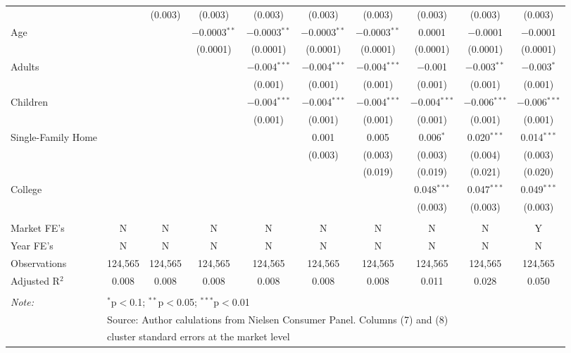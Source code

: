 \begin{table}[!htbp]
\begin{tabular}{@{\extracolsep{5pt}}lccccccccc}
  &  & (0.003) & (0.003) & (0.003) & (0.003) & (0.003) & (0.003) & (0.003) & (0.003) \\ 
  Age &  &  & $-$0.0003$^{**}$ & $-$0.0003$^{**}$ & $-$0.0003$^{**}$ & $-$0.0003$^{**}$ & 0.0001 & $-$0.0001 & $-$0.0001 \\ 
  &  &  & (0.0001) & (0.0001) & (0.0001) & (0.0001) & (0.0001) & (0.0001) & (0.0001) \\ 
  Adults &  &  &  & $-$0.004$^{***}$ & $-$0.004$^{***}$ & $-$0.004$^{***}$ & $-$0.001 & $-$0.003$^{**}$ & $-$0.003$^{*}$ \\ 
  &  &  &  & (0.001) & (0.001) & (0.001) & (0.001) & (0.001) & (0.001) \\ 
  Children &  &  &  & $-$0.004$^{***}$ & $-$0.004$^{***}$ & $-$0.004$^{***}$ & $-$0.004$^{***}$ & $-$0.006$^{***}$ & $-$0.006$^{***}$ \\ 
  &  &  &  & (0.001) & (0.001) & (0.001) & (0.001) & (0.001) & (0.001) \\ 
  Single-Family Home &  &  &  &  & 0.001 & 0.005 & 0.006$^{*}$ & 0.020$^{***}$ & 0.014$^{***}$ \\ 
  &  &  &  &  & (0.003) & (0.003) & (0.003) & (0.004) & (0.003) \\ 
  &  &  &  &  &  & (0.019) & (0.019) & (0.021) & (0.020) \\ 
  College &  &  &  &  &  &  & 0.048$^{***}$ & 0.047$^{***}$ & 0.049$^{***}$ \\ 
  &  &  &  &  &  &  & (0.003) & (0.003) & (0.003) \\ 
 \hline \\[-1.8ex] 
Market FE's & N & N & N & N & N & N & N & N & Y \\ 
Year FE's & N & N & N & N & N & N & N & N & N \\ 
Observations & 124,565 & 124,565 & 124,565 & 124,565 & 124,565 & 124,565 & 124,565 & 124,565 & 124,565 \\ 
Adjusted R$^{2}$ & 0.008 & 0.008 & 0.008 & 0.008 & 0.008 & 0.008 & 0.011 & 0.028 & 0.050 \\ 
\hline 
\hline \\[-1.8ex] 
\textit{Note:}  & \multicolumn{9}{l}{$^{*}$p$<$0.1; $^{**}$p$<$0.05; $^{***}$p$<$0.01} \\ 
 & \multicolumn{9}{l}{Source: Author calulations from Nielsen Consumer Panel. Columns (7) and (8) } \\ 
 & \multicolumn{9}{l}{cluster standard errors at the market level} \\ 
\end{tabular} 
\end{table} 
